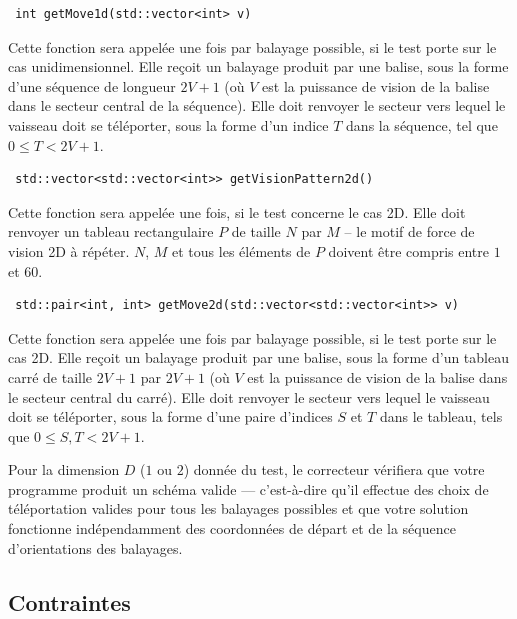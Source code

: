 \documentclass[12pt]{article}
\begin{document}
\begin{lstlisting}
 int getMove1d(std::vector<int> v)
\end{lstlisting}

Cette fonction sera appelée une fois par balayage possible, si le test porte sur le cas unidimensionnel. Elle reçoit un balayage produit par une balise, sous la forme d'une séquence de longueur $2V + 1$ (où $V$ est la puissance de vision de la balise dans le secteur central de la séquence). Elle doit renvoyer le secteur vers lequel le vaisseau doit se téléporter, sous la forme d'un indice $T$ dans la séquence, tel que $0 \leq T < 2V + 1$.

\begin{lstlisting}
 std::vector<std::vector<int>> getVisionPattern2d()
\end{lstlisting}

Cette fonction sera appelée une fois, si le test concerne le cas 2D. Elle doit renvoyer un tableau rectangulaire $P$ de taille $N$ par $M$ -- le motif de force de vision 2D à répéter. $N$, $M$ et tous les éléments de $P$ doivent être compris entre $1$ et $60$.

\begin{lstlisting}
 std::pair<int, int> getMove2d(std::vector<std::vector<int>> v)
\end{lstlisting}

Cette fonction sera appelée une fois par balayage possible, si le test porte sur le cas 2D. Elle reçoit un balayage produit par une balise, sous la forme d'un tableau carré de taille $2V + 1$ par $2V + 1$ (où $V$ est la puissance de vision de la balise dans le secteur central du carré). Elle doit renvoyer le secteur vers lequel le vaisseau doit se téléporter, sous la forme d'une paire d'indices $S$ et $T$ dans le tableau, tels que $0 \leq S, T < 2V + 1$.

Pour la dimension $D$ ($1$ ou $2$) donnée du test, le correcteur vérifiera que votre programme produit un schéma valide — c'est-à-dire qu'il effectue des choix de téléportation valides pour tous les balayages possibles et que votre solution fonctionne indépendamment des coordonnées de départ et de la séquence d'orientations des balayages.

\subsection{Contraintes}

\vspace{0.1em}
\end{document}
